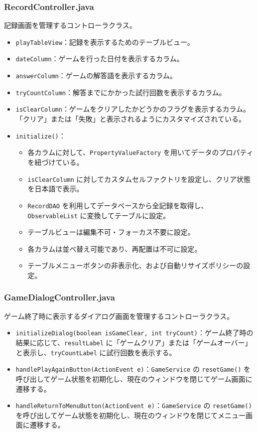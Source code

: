 \documentclass[a4j]{ujarticle}
\begin{document}
\subsubsection{RecordController.java}
記録画面を管理するコントローラクラス。

\begin{itemize}
  \item \texttt{playTableView}：記録を表示するためのテーブルビュー。
  \item \texttt{dateColumn}：ゲームを行った日付を表示するカラム。
  \item \texttt{answerColumn}：ゲームの解答語を表示するカラム。
  \item \texttt{tryCountColumn}：解答までにかかった試行回数を表示するカラム。
  \item \texttt{isClearColumn}：ゲームをクリアしたかどうかのフラグを表示するカラム。「クリア」または「失敗」と表示されるようにカスタマイズされている。
  \item \texttt{initialize()}：
  \begin{itemize}
    \item 各カラムに対して、\texttt{PropertyValueFactory} を用いてデータのプロパティを紐づけている。
    \item \texttt{isClearColumn} に対してカスタムセルファクトリを設定し、クリア状態を日本語で表示。
    \item \texttt{RecordDAO} を利用してデータベースから全記録を取得し、\texttt{ObservableList} に変換してテーブルに設定。
    \item テーブルビューは編集不可・フォーカス不要に設定。
    \item 各カラムは並べ替え可能であり、再配置は不可に設定。
    \item テーブルメニューボタンの非表示化、および自動リサイズポリシーの設定。
  \end{itemize}
\end{itemize}

\subsubsection{GameDialogController.java}
ゲーム終了時に表示するダイアログ画面を管理するコントローラクラス。

\begin{itemize}
\item \texttt{initializeDialog(boolean isGameClear, int tryCount)}：ゲーム終了時の結果に応じて、\texttt{resultLabel} に「ゲームクリア」または「ゲームオーバー」と表示し、\texttt{tryCountLabel} に試行回数を表示する。
\item \texttt{handlePlayAgainButton(ActionEvent e)}：\texttt{GameService} の \texttt{resetGame()} を呼び出してゲーム状態を初期化し、現在のウィンドウを閉じてゲーム画面に遷移する。
\item \texttt{handleReturnToMenuButton(ActionEvent e)}：\texttt{GameService} の \texttt{resetGame()} を呼び出してゲーム状態を初期化し、現在のウィンドウを閉じてメニュー画面に遷移する。
\end{itemize}
\end{document}
